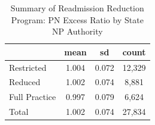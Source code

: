 \begin{table}[htbp]\centering
\def\sym#1{\ifmmode^{#1}\else\(^{#1}\)\fi}
\caption{Summary of Readmission Reduction Program: PN Excess Ratio by State NP Authority}
\begin{tabular}{l*{1}{ccc}}
\toprule
                    &        mean&          sd&       count\\
\midrule
Restricted          &       1.004&       0.072&      12,329\\
Reduced             &       1.002&       0.074&       8,881\\
Full Practice       &       0.997&       0.079&       6,624\\
Total               &       1.002&       0.074&      27,834\\
\bottomrule
\end{tabular}
\end{table}
